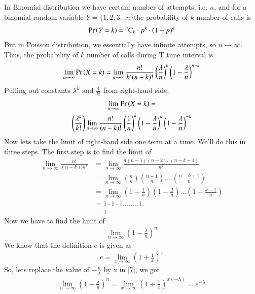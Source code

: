 \documentclass[journal,12pt,twocolumn]{IEEEtran}
\begin{document}
In Binomial distribution we have certain number of attempts, i.e. $n$, and for a binomial random variable $Y=\{1,2,3...n\}$the probability of $k$ number of calls is 
\begin{align}
    \Pr\left(Y=k\right)={}^{n}\mathrm{C}_{k}\cdot p^k\cdot(1-p)^k
\end{align} But in Poisson distribution, we essentially have infinite attempts, so $n\rightarrow\infty$. Thus, the probability of $k$ number of calls during T time interval is
\begin{align}
   \lim_{n \to \infty}\Pr\left(X=k\right)=\lim_{n \to \infty}\frac{n!}{k!(n-k)!}\left(\frac{\lambda}{n}\right)^k\left(1-\frac{\lambda}{n}\right)^{n-k}
\end{align}
Pulling out constants $\lambda^k$ and $\frac{1}{k!}$ from right-hand side,
\begin{multline}  \label{5}
    \lim_{n \to \infty}\Pr\left(X=k\right)=\\
    \left(\frac{\lambda^k}{k!}\right)\lim_{n \to \infty}\frac{n!}{(n-k)!}\left(\frac{1}{n}\right)^k\left(1-\frac{\lambda}{n}\right)^n\left(1-\frac{\lambda}{n}\right)^{-k}
\end{multline}
Now lets take the limit of right-hand side one term at a time. We’ll do this in three steps. The first step is to find the limit of 
\begin{equation}
\begin{split}\label{6}
     \lim_{n \to \infty}\frac{n!}{(n-k)!n^k}
     &= \lim_{n \to \infty}\frac{n(n-1)(n-2)..(n-k+1)}{n^k}\\
    & = \lim_{n \to\infty}\left(\frac{n}{n}\right)\left(\frac{n-1}{n}\right)....\left(\frac{n-k+1}{n}\right)\\
   &= \lim_{n \to \infty}\left(1-\frac{1}{n}\right)\left(1-\frac{2}{n}\right)...\left(1-\frac{k-1}{n}\right)\\
    &=1\cdot1\cdot1........1\\
    &=1   
    \end{split}
\end{equation}
Now we have to find the limit of 
\begin{align}\label{7}
    \lim_{n \to \infty}\left(1-\frac{\lambda}{n}\right)^n 
\end{align}
We know that the definition $e$ is given as 
\begin{align}
    e=\lim_{x \to \infty}\left(1+\frac{1}{x}\right)^x
\end{align}
So, lets replace the value of $-\frac{n}{\lambda}$ by x in \ref{7}, we get
\begin{align}\label{9}
    \lim_{n \to \infty}\left(1-\frac{\lambda}{n}\right)^n =\lim_{x \to \infty}\left(1+\frac{1}{x}\right)^{x(-\lambda)}=e^{-\lambda}
\end{align}
\end{document}

